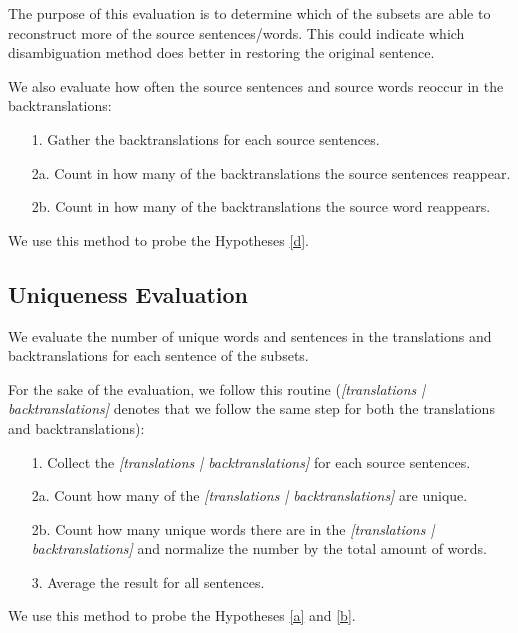 The purpose of this evaluation is to determine which of the subsets are able to reconstruct more of the source sentences/words. This could indicate which disambiguation method does better in restoring the original sentence. 

We also evaluate how often the source sentences and source words reoccur in the backtranslations:

\begin{enumerate}
    \item[1. ] Gather the backtranslations for each source sentences.
    \item[2a. ] Count in how many of the backtranslations the source sentences reappear.
    \item[2b. ] Count in how many of the backtranslations the source word reappears.
\end{enumerate}

We use this method to probe the Hypotheses \ref{d}. 

\subsection{Uniqueness Evaluation}
\label{sec:Base_Experiment:Statistics:Uniqueness}
We evaluate the number of unique words and sentences in the translations and backtranslations for each sentence of the subsets. 

For the sake of the evaluation, we follow this routine (\textit{[translations | backtranslations]} denotes that we follow the same step for both the translations and backtranslations):
\begin{enumerate}
    \item[1. ] Collect the \textit{[translations | backtranslations]} for each source sentences.
    \item[2a. ] Count how many of the \textit{[translations | backtranslations]} are unique. 
    \item[2b. ] Count how many unique words there are in the \textit{[translations | backtranslations]} and normalize the number by the total amount of words. 
    \item[3. ] Average the result for all sentences.
\end{enumerate}

We use this method to probe the Hypotheses \ref{a} and \ref{b}. 

